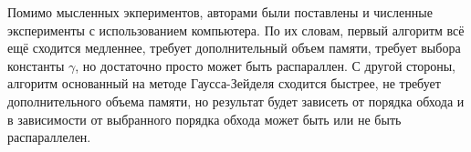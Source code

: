 	Помимо мысленных экпериментов, авторами были поставлены и численные эксперименты с использованием компьютера. По их словам, первый алгоритм всё ещё сходится медленнее, требует дополнительный объем памяти, требует выбора константы $\gamma$, но достаточно просто может быть распараллен. С другой стороны, алгоритм основанный на методе Гаусса-Зейделя сходится быстрее, не требует дополнительного объема памяти, но результат будет зависеть от порядка обхода и в зависимости от выбранного порядка обхода может быть или не быть распараллелен.

%
